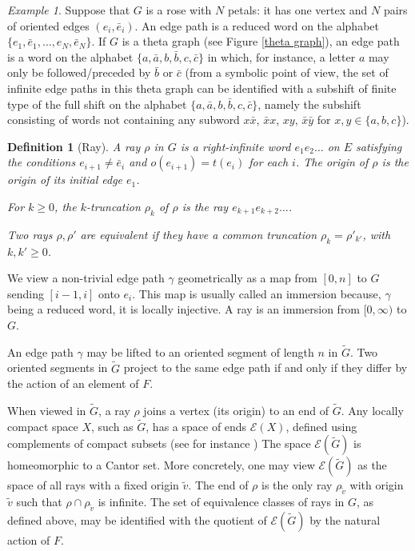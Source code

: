\documentclass[11pt]{amsart}
\newtheorem{dfn}[thm]{Definition}
\theoremstyle{remark}
\newtheorem{example}[thm]{Example}
\newcommand {\cale} {{\mathcal {E}}}
\begin{document}
   \begin{example} \label{teta}
 Suppose that $G$ is a rose with $N$ petals: it has one vertex and $N$ pairs of  oriented edges $(e_i,\bar e_i)$. An edge path is a reduced word on the alphabet $\{e_1,\bar e_1,\dots,e_N, \bar e_N\}$. If $G$ is a theta graph (see Figure \ref{theta graph}), an edge path is a word on the alphabet $\{a,\bar a, b, \bar b, c,\bar c\}$ in which, for instance,  a letter $a$ may only be followed/preceded by $\bar b$ or $\bar c$ 
 (from a symbolic point of view, the set of  infinite edge paths in this theta graph can be identified with a subshift of finite type of the full shift on the alphabet $\{a,\bar a, b, \bar b, c,\bar c\}$, namely  the subshift consisting of   words  not containing any subword $x\bar x$, $\bar x x$, $xy$, $\bar x\bar y$ for $x,y\in\{a,b,c\}$).
 \end{example}

  
 \begin{dfn} [Ray] \label{ray}
 A ray $\rho$ in $G$ is a right-infinite word $e_1e_2\dots$ on $E$  satisfying the  conditions $e_{i+1}\ne \bar e_i$ and $o(e_{i+1}) =t(e_i)$ for each $i$.     The origin of $\rho$ is the origin of its initial edge $e_1$.
 
 For $k\ge0$, the \emph{$k$-truncation} $\rho_k$ of $\rho$ is the ray $e_{k+1}e_{k+2}\dots$. 
 
 Two rays $\rho,\rho'$ are \emph{equivalent} if they have a common truncation $\rho_k=\rho'_{k'} $, with $k,k'\ge0$.
 \end{dfn}
 
 
We view a non-trivial  edge path $\gamma$    geometrically as a map from $[0,n]$ to $G$ sending $[i-1,i]$ onto $e_i$. This map is usually called an immersion because, $\gamma$ being a reduced word,  it is locally injective. A ray is an immersion from $[0,\infty)$ to $G$. 

An edge path  $\gamma$ may be lifted to an oriented  segment of length $n$ in $\tilde G$. Two oriented segments in $\tilde G$ project to  the same edge path if and only if they differ by the action of an element of $F$. 

When viewed in $\tilde G$, a ray $\rho$ joins a vertex (its origin) to an end of $\tilde G$. Any locally compact space $X$, such as $\tilde G$, has a space of ends $\cale(X)$, defined using complements of compact subsets   (see for instance \cite{BridHa, ross})  The space $\cale(\tilde G)$ is homeomorphic to a Cantor set. More concretely, one may view $\cale(\tilde G)$
as the space of all rays with a fixed origin $\tilde v$. The end of $\rho$ is the only ray $\rho_{\tilde v}$ with origin $\tilde v$ such that $\rho\cap\rho_{\tilde v}$ is infinite. The set of equivalence classes of rays in $G$, as defined above, may be identified with the quotient of $\cale(\tilde G)$ by the natural action of $F$. 
\end{document}

